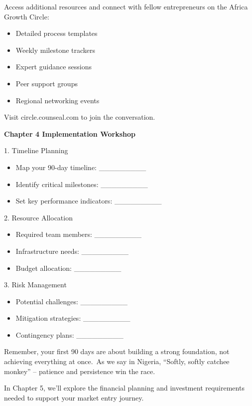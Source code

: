 \begin{communitybox}
Access additional resources and connect with fellow entrepreneurs on the Africa Growth Circle:
\begin{itemize}
    \item Detailed process templates
    \item Weekly milestone trackers
    \item Expert guidance sessions
    \item Peer support groups
    \item Regional networking events
\end{itemize}
Visit circle.counseal.com to join the conversation.
\end{communitybox}

\begin{workshopbox}
\textbf{Chapter 4 Implementation Workshop}

1. Timeline Planning
\begin{itemize}
    \item Map your 90-day timeline: \_\_\_\_\_\_\_\_\_
    \item Identify critical milestones: \_\_\_\_\_\_\_\_\_
    \item Set key performance indicators: \_\_\_\_\_\_\_\_\_
\end{itemize}

2. Resource Allocation
\begin{itemize}
    \item Required team members: \_\_\_\_\_\_\_\_\_
    \item Infrastructure needs: \_\_\_\_\_\_\_\_\_
    \item Budget allocation: \_\_\_\_\_\_\_\_\_
\end{itemize}

3. Risk Management
\begin{itemize}
    \item Potential challenges: \_\_\_\_\_\_\_\_\_
    \item Mitigation strategies: \_\_\_\_\_\_\_\_\_
    \item Contingency plans: \_\_\_\_\_\_\_\_\_
\end{itemize}
\end{workshopbox}

\begin{importantbox}
Remember, your first 90 days are about building a strong foundation, not achieving everything at once.\ As we say in Nigeria, ``Softly, softly catchee monkey'' – patience and persistence win the race.

In Chapter 5, we'll explore the financial planning and investment requirements needed to support your market entry journey.
\end{importantbox}